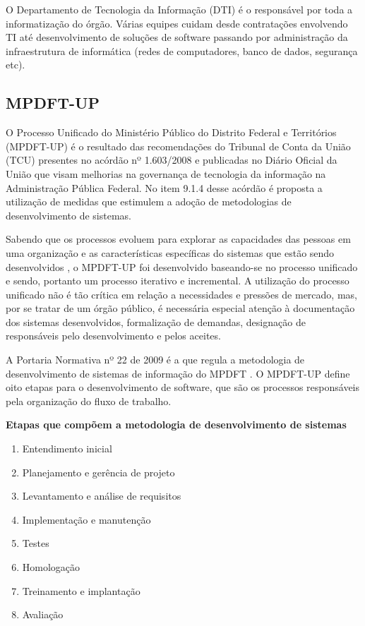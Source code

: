 \documentclass[
	article,			%
	11pt,				%
	oneside,			%
	a4paper,			%
	english,			%
	brazil,				%
	sumario=tradicional
	]{abntex2}
\begin{document}
O Departamento de Tecnologia da Informação (DTI) é o responsável por toda a
informatização do órgão. Várias equipes cuidam desde contratações envolvendo TI
até desenvolvimento de soluções de software passando por administração da
infraestrutura de informática (redes de computadores, banco de dados, segurança
etc).

\subsection{MPDFT-UP}

O Processo Unificado do Ministério Público do Distrito Federal e Territórios
(MPDFT-UP) \cite{mpdft-up} é o resultado das recomendações do Tribunal de Conta
da União (TCU) presentes no acórdão nº 1.603/2008 \cite{acordao-tcu-1603-2008}
e publicadas no Diário Oficial da União \cite{dou-20080818} que visam melhorias
na governança de tecnologia da informação na Administração Pública Federal. No
item 9.1.4 desse acórdão é proposta a utilização de medidas que estimulem a
adoção de metodologias de desenvolvimento de sistemas.

Sabendo que os processos evoluem para explorar as capacidades das pessoas em uma
organização e as características específicas do sistemas que estão sendo
desenvolvidos \cite{sommerville2007}, o MPDFT-UP foi desenvolvido baseando-se
no processo unificado e sendo, portanto um processo iterativo e incremental. A
utilização do processo unificado não é tão crítica em relação a necessidades e
pressões de mercado, mas, por se tratar de um órgão público, é necessária
especial atenção à documentação dos sistemas desenvolvidos, formalização de
demandas, designação de responsáveis pelo desenvolvimento e pelos aceites.

A Portaria Normativa nº 22 de 2009 é a que regula a metodologia de
desenvolvimento de sistemas de informação do MPDFT \cite{portaria-22-2009}. O
MPDFT-UP define oito etapas para o desenvolvimento de software, que são os
processos responsáveis pela organização do fluxo de trabalho.

\textbf{Etapas que compõem a metodologia de desenvolvimento de sistemas}

\begin{enumerate}
   \item Entendimento inicial
   \item Planejamento e gerência de projeto
   \item Levantamento e análise de requisitos
   \item Implementação e manutenção
   \item Testes
   \item Homologação
   \item Treinamento e implantação
   \item Avaliação
\end{enumerate}
\end{document}
